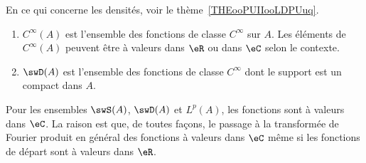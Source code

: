                 \label{THEMooNMYKooVVeGTU}

En ce qui concerne les densités, voir le thème~\ref{THEooPUIIooLDPUuq}.
\begin{enumerate}
	\item
	      \(  C^{\infty}(A)\) est l'ensemble des fonctions de classe \(  C^{\infty}\) sur \( A\). Les éléments de \(  C^{\infty}(A)\) peuvent être à valeurs dans \( \eR\) ou dans \( \eC\) selon le contexte.
	\item
	      \( \swD(A)\) est l'ensemble des fonctions de classe \(  C^{\infty}\) dont le support est un compact dans \( A\).
\end{enumerate}
Pour les ensembles \( \swS(A)\), \( \swD(A)\) et \( L^p(A)\), les fonctions sont à valeurs dans \( \eC\). La raison est que, de toutes façons, le passage à la transformée de Fourier produit en général des fonctions à valeurs dans \( \eC\) même si les fonctions de départ sont à valeurs dans \( \eR\).

